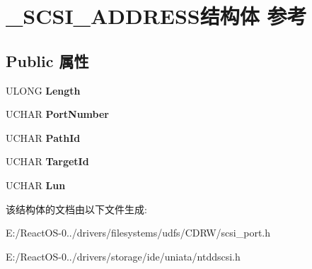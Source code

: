 \hypertarget{struct___s_c_s_i___a_d_d_r_e_s_s}{}\section{\+\_\+\+S\+C\+S\+I\+\_\+\+A\+D\+D\+R\+E\+S\+S结构体 参考}
\label{struct___s_c_s_i___a_d_d_r_e_s_s}
\subsection*{Public 属性}
\begin{DoxyCompactItemize}
\item 
\mbox{\label{struct___s_c_s_i___a_d_d_r_e_s_s_a86d32313189f3c2fc04ac47334a2bd70}} 
U\+L\+O\+NG {\bfseries Length}
\item 
\mbox{\label{struct___s_c_s_i___a_d_d_r_e_s_s_a9d8193e3d27b108608d8c4ac5a13c019}} 
U\+C\+H\+AR {\bfseries Port\+Number}
\item 
\mbox{\label{struct___s_c_s_i___a_d_d_r_e_s_s_a5ff9d6e500816a703800313c57a0be7f}} 
U\+C\+H\+AR {\bfseries Path\+Id}
\item 
\mbox{\label{struct___s_c_s_i___a_d_d_r_e_s_s_a80372d6d4106fa97418ff1c538d14d78}} 
U\+C\+H\+AR {\bfseries Target\+Id}
\item 
\mbox{\label{struct___s_c_s_i___a_d_d_r_e_s_s_acb8f08ec325e652fd251fb58855eb19d}} 
U\+C\+H\+AR {\bfseries Lun}
\end{DoxyCompactItemize}


该结构体的文档由以下文件生成\+:\begin{DoxyCompactItemize}
\item 
E\+:/\+React\+O\+S-\/0../drivers/filesystems/udfs/\+C\+D\+R\+W/scsi\+\_\+port.\+h\item 
E\+:/\+React\+O\+S-\/0../drivers/storage/ide/uniata/ntddscsi.\+h\end{DoxyCompactItemize}
